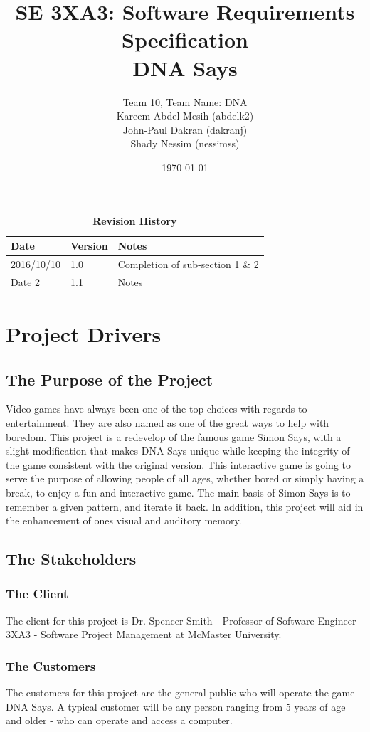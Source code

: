 \documentclass[12pt, titlepage]{article}
\title{SE 3XA3: Software Requirements Specification\\DNA Says}
\author{Team 10, Team Name: DNA
		\\ Kareem Abdel Mesih (abdelk2)
		\\ John-Paul Dakran (dakranj)
		\\ Shady Nessim (nessimss)
}
\date{\today}
\begin{document}
\maketitle
{}
\tableofcontents
\listoftables
\listoffigures
\begin{table}[bp]
\caption{\bf Revision History}
\begin{tabularx}{\textwidth}{p{3cm}p{2cm}X}
\toprule {\bf Date} & {\bf Version} & {\bf Notes}\\
\midrule
2016/10/10 & 1.0 & Completion of sub-section 1 \& 2\\
Date 2 & 1.1 & Notes\\
\bottomrule
\end{tabularx}
\end{table}
\newpage
{}


\section{Project Drivers}

\subsection{The Purpose of the Project}
Video games have always been one of the top choices with regards to entertainment. They are also named as one of the great ways to help with boredom. This project is a redevelop of the famous game Simon Says, with a slight modification that makes DNA Says unique while keeping the integrity of the game consistent with the original version. This interactive game is going to serve the purpose of allowing people of all ages, whether bored or simply having a break, to enjoy a fun and interactive game. The main basis of Simon Says is to remember a given pattern, and iterate it back. In addition, this project will aid in the enhancement of ones visual and auditory memory.
\subsection{The Stakeholders}

\subsubsection{The Client}
The client for this project is Dr. Spencer Smith - Professor of Software Engineer 3XA3 - Software Project Management at McMaster University.

\subsubsection{The Customers}
The customers for this project are the general public who will operate the game DNA Says. A typical customer will be any person ranging from 5 years of age and older - who can operate and access a computer. 
\end{document}
